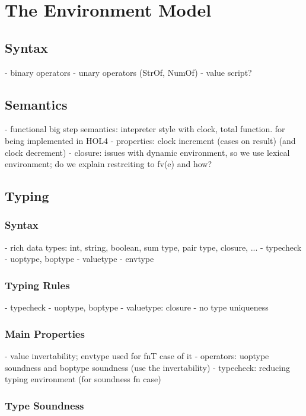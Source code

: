 \chapter{The Environment Model}\label{chap:richerLang}

\section{Syntax}\label{sec:envSyntax}
- binary operators
- unary operators (StrOf, NumOf)
- value script?

\section{Semantics}\label{sec:envSemantics}
- functional big step semantics: intepreter style with clock, total function. for being implemented in HOL4
- properties: clock increment (cases on result) (and clock decrement)
- closure: issues with dynamic environment, so we use lexical environment;
do we explain restrciting to fv(e) and how?

\section{Typing}\label{sec:envTyping}

\subsection{Syntax}\label{subsec:envTypingSyntax}
- rich data types: int, string, boolean, sum type, pair type, closure, ...
- typecheck
- uoptype, boptype
- valuetype
- envtype

\subsection{Typing Rules}\label{subsec:envTypingRules}
- typecheck
- uoptype, boptype
- valuetype: closure
- no type uniqueness

\subsection{Main Properties}\label{subsec:envTypingProperties}
- value invertability; envtype used for fnT case of it
- operators: uoptype soundness and boptype soundness (use the invertability)
- typecheck: reducing typing environment (for soundness fn case)

\subsection{Type Soundness}\label{subsec:envTypingSoundness}

